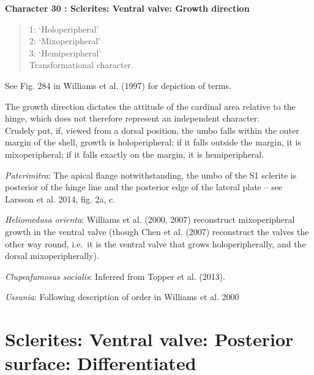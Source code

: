 \documentclass[]{book}
\theoremstyle{definition}
\theoremstyle{definition}
\theoremstyle{definition}
\theoremstyle{remark}
\begin{document}
\textbf{Character 30 : Sclerites: Ventral valve: Growth direction }

\begin{quote}
1: `Holoperipheral'\\
2: `Mixoperipheral'\\
3: `Hemiperipheral'\\
Transformational character.
\end{quote}

See Fig. 284 in Williams et al. (1997) for depiction of terms.

The growth direction dictates the attitude of the cardinal area relative
to the hinge, which does not therefore represent an independent
character.\\
Crudely put, if, viewed from a dorsal position, the umbo falls within
the outer margin of the shell, growth is holoperipheral; if it falls
outside the margin, it is mixoperipheral; if it falls exactly on the
margin, it is hemiperipheral.

\emph{Paterimitra}: The apical flange notwithstanding, the umbo of the
S1 sclerite is posterior of the hinge line and the posterior edge of the
lateral plate -- see Larsson et al. 2014, fig. 2a, c.

\emph{Heliomedusa orienta}: Williams et al. (2000, 2007) reconstruct
mixoperipheral growth in the ventral valve (though Chen et al. (2007)
reconstruct the valves the other way round, i.e.~it is the ventral valve
that grows holoperipherally, and the dorsal mixoperipherally).

\emph{Clupeafumosus socialis}: Inferred from Topper et al. (2013).

\emph{Ussunia}: Following description of order in Williams et al. 2000

\hypertarget{sclerites-ventral-valve-posterior-surface-differentiated}{%
\section*{Sclerites: Ventral valve: Posterior surface:
Differentiated}\label{sclerites-ventral-valve-posterior-surface-differentiated}}
\end{document}
